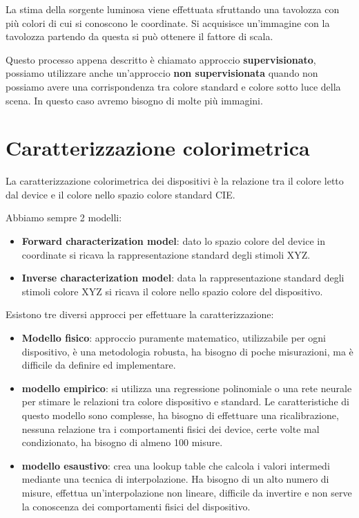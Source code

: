 La stima della sorgente luminosa viene effettuata sfruttando una tavolozza con
più colori di cui si conoscono le coordinate. Si acquisisce un'immagine con la
tavolozza partendo da questa si può ottenere il fattore di scala.

Questo processo appena descritto è chiamato approccio \textbf{supervisionato},
possiamo utilizzare anche un'approccio \textbf{non supervisionata} quando non
possiamo avere una corrispondenza tra colore standard e colore sotto luce della
scena. In questo caso avremo bisogno di molte più immagini.
\section{Caratterizzazione colorimetrica}
La caratterizzazione colorimetrica dei dispositivi è la relazione tra il colore
letto dal device e il colore nello spazio colore standard CIE.

Abbiamo sempre 2 modelli:
\begin{itemize}
    \item \textbf{Forward characterization model}: dato lo spazio colore del device
          in coordinate si ricava la rappresentazione standard degli stimoli XYZ.
    \item \textbf{Inverse characterization model}: data la rappresentazione standard
          degli stimoli colore XYZ si ricava il colore nello spazio colore del dispositivo.
\end{itemize}

Esistono tre diversi approcci per effettuare la caratterizzazione:
\begin{itemize}
    \item \textbf{Modello fisico}: approccio puramente matematico, utilizzabile
          per ogni dispositivo, è una metodologia robusta, ha bisogno di poche
          misurazioni, ma è difficile da definire ed implementare.
    \item \textbf{modello empirico}: si utilizza una regressione polinomiale o
          una rete neurale per stimare le relazioni tra colore dispositivo e
          standard. Le caratteristiche di questo modello sono complesse, ha
          bisogno di effettuare una ricalibrazione, nessuna relazione tra i
          comportamenti fisici dei device, certe volte mal condizionato, ha
          bisogno di almeno 100 misure.
    \item \textbf{modello esaustivo}: crea una lookup table che calcola i valori
          intermedi mediante una tecnica di interpolazione. Ha bisogno di un alto
          numero di misure, effettua un'interpolazione non lineare, difficile da
          invertire e non serve la conoscenza dei comportamenti fisici del dispositivo.
\end{itemize}

